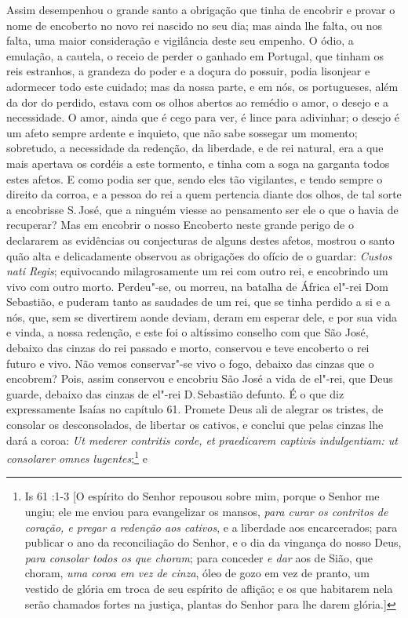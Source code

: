 Assim desempenhou o grande santo a obrigação que tinha de encobrir e
provar o nome de encoberto no novo rei nascido no seu dia; mas ainda lhe
falta, ou nos falta, uma maior consideração e vigilância deste seu
empenho. O ódio, a emulação, a cautela, o receio de perder o ganhado em
Portugal, que tinham os reis estranhos, a grandeza do poder e a doçura
do possuir, podia lisonjear e adormecer todo este cuidado; mas da nossa
parte, e em nós, os portugueses, além da dor do perdido, estava com os
olhos abertos ao remédio o amor, o desejo e a necessidade. O amor, ainda
que é cego para ver, é lince para adivinhar; o desejo é um afeto sempre
ardente e inquieto, que não sabe sossegar um momento; sobretudo, a
necessidade da redenção, da liberdade, e de rei natural, era a que mais
apertava os cordéis a este tormento, e tinha com a soga na garganta
todos estes afetos. E como podia ser que, sendo eles tão vigilantes, e
tendo sempre o direito da corroa, e a pessoa do rei a quem pertencia
diante dos olhos, de tal sorte a encobrisse S.\,José, que a ninguém
viesse ao pensamento ser ele o que o havia de recuperar? Mas em encobrir
o nosso Encoberto neste grande perigo de o declararem as evidências ou
conjecturas de alguns destes afetos, mostrou o santo quão alta e
delicadamente observou as obrigações do ofício de o guardar:
\emph{Custos nati Regis}; equivocando milagrosamente um rei com outro
rei, e encobrindo um vivo com outro morto. Perdeu"-se, ou morreu, na
batalha de África el"-rei Dom Sebastião, e puderam tanto as saudades de
um rei, que se tinha perdido a si e a nós, que, sem se divertirem aonde
deviam, deram em esperar dele, e por sua vida e vinda, a nossa redenção,
e este foi o altíssimo conselho com que São José, debaixo das cinzas do
rei passado e morto, conservou e teve encoberto o rei futuro e vivo. Não
vemos conservar"-se vivo o fogo, debaixo das cinzas que o encobrem? Pois,
assim conservou e encobriu São José a vida de el"-rei, que Deus guarde,
debaixo das cinzas de el"-rei D.\,Sebastião defunto. É o que diz
expressamente Isaías no capítulo 61. Promete Deus ali de alegrar os
tristes, de consolar os desconsolados, de libertar os cativos, e conclui
que pelas cinzas lhe dará a coroa: \emph{Ut mederer contritis corde, et
praedicarem captivis indulgentiam: ut consolarer omnes lugentes};\footnote{Is 61 :1-3 [O espírito do Senhor repousou sobre mim, porque o Senhor me ungiu; ele me enviou para evangelizar os mansos, \textit{para curar os contritos de coração, e pregar a redenção aos cativos}, e a liberdade aos encarcerados; para publicar o ano da reconciliação do Senhor, e o dia da vingança do nosso Deus, \textit{para consolar todos os que choram}; para conceder \textit{e dar} aos de Sião, que choram, \textit{uma coroa em vez de cinza}, óleo de gozo em vez de pranto, um vestido de glória em troca de seu espírito de aflição; e os que habitarem nela serão chamados fortes na justiça, plantas do Senhor para lhe darem glória.]} e
